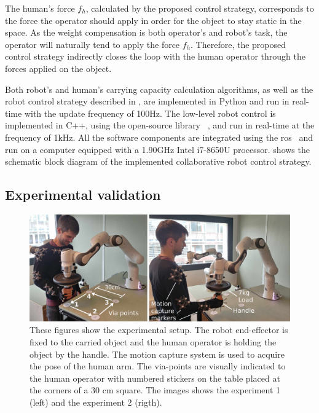 The human's force $f_h$, calculated by the proposed control strategy, corresponds to the force the operator should apply in order for the object to stay static in the space. As the weight compensation is both operator's and robot's task, the operator will naturally tend to apply the force $f_h$. 
Therefore, the proposed control strategy indirectly closes the loop with the human operator through the forces applied on the object.

Both robot's and human's carrying capacity calculation algorithms, as well as the robot control strategy described in , are implemented in Python and run in real-time with the update frequency of 100Hz. The low-level robot control is implemented in C++, using the open-source library ~\cite{pinocchio2021}, and run in real-time at the frequency of 1kHz. All the software components are integrated using the \gls{ros}~\cite{ros} and run on a computer equipped with a 1.90GHz Intel i7-8650U processor. 
 shows the schematic block diagram of the implemented collaborative robot control strategy. 

\subsection{Experimental validation}
\label{sec:human_robot_experiment}

\begin{figure}[!h]
    \centering
    \includegraphics[width=\linewidth]{Papers/images/both_pose_explanation.jpg}
    \caption{{These figures show the experimental setup. The robot end-effector is fixed to the carried object and the human operator is holding the object by the handle. The motion capture system is used to acquire the pose of the human arm. The via-points are visually indicated to the human operator with numbered stickers on the table placed at the corners of a 30 cm square. The images shows the experiment 1 (left) and the experiment 2 (rigth).}}
    \label{fig:experiment2}
\end{figure}


